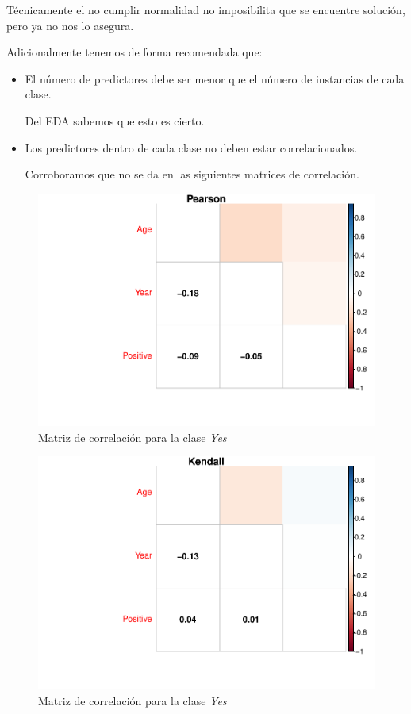 Técnicamente el no cumplir normalidad no imposibilita que se encuentre solución, pero ya no nos lo asegura.

\newpage

Adicionalmente tenemos de forma recomendada que: 
\begin{itemize}
  \item El número de predictores debe ser menor que el número de instancias de cada clase. 
  
  Del EDA sabemos que esto es cierto.
  \item Los predictores dentro de cada clase no deben estar correlacionados.
  
  Corroboramos que no se da en las siguientes matrices de correlación.
\end{itemize}

\vspace{\baselineskip}

\begin{figure}[H]\center\includegraphics[width=.9\linewidth]{img/Clasificacion_files/figure-latex/unnamed-chunk-25-1}\caption{Matriz de correlación para la clase \textit{Yes}}\end{figure}

\begin{figure}[H]\center\includegraphics[width=.9\linewidth]{img/Clasificacion_files/figure-latex/unnamed-chunk-25-2}\caption{Matriz de correlación para la clase \textit{Yes}}\end{figure}

